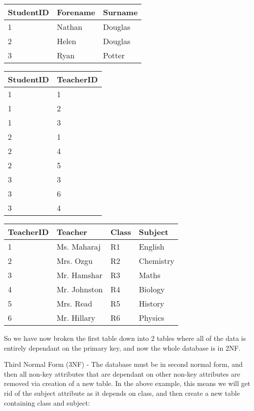 \begin{table}[H]
	\begin{tabular}{| l | l | l |}
		\hline
		StudentID & Forename & Surname \\\hline
		1 & Nathan & Douglas\\\hline
		2 & Helen & Douglas\\\hline
		3 & Ryan & Potter\\\hline
	\end{tabular}
	
	\begin{tabular}{| l | l |}
		\hline
		StudentID & TeacherID\\\hline
		1 & 1\\\hline
		1 & 2\\\hline
		1 & 3\\\hline
		2 & 1\\\hline
		2 & 4\\\hline
		2 & 5\\\hline
		3 & 3\\\hline
		3 & 6\\\hline
		3 & 4\\\hline
	\end{tabular}
	
	\begin{tabular}{| l | l | l | l |}
		\hline
		TeacherID & Teacher & Class & Subject \\\hline
		1 & Ms. Maharaj & R1 & English \\\hline
		2 & Mrs. Ozgu & R2 & Chemistry \\\hline
		3 & Mr. Hamshar & R3 & Maths \\\hline
		4 & Mr. Johnston & R4 & Biology \\\hline
		5 & Mrs. Read & R5 & History \\\hline
		6 & Mr. Hillary & R6 & Physics \\\hline
	\end{tabular}
\end{table}

So we have now broken the first table down into 2 tables where all of the data is entirely dependant on the primary key, and now the whole database is in 2NF.

Third Normal Form (3NF) - The database must be in second normal form, and then all non-key attributes that are dependant on other non-key attributes are removed via creation of a new table. In the above example, this means we will get rid of the subject attribute as it depends on class, and then create a new table containing class and subject:

